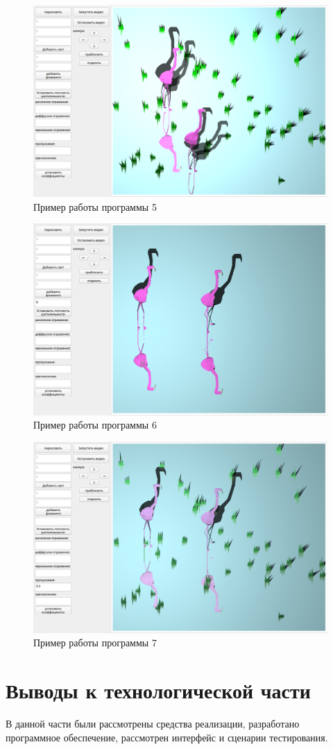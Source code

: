 \begin{figure}[h!]
	\centering
	\includegraphics[width=0.9\linewidth]{img/ex5}
	\caption{Пример работы программы 5}
	\label{fig:ex5}
\end{figure}

\begin{figure}[h!]
	\centering
	\includegraphics[width=0.9\linewidth]{img/ex7}
	\caption{Пример работы программы 6}
	\label{fig:ex6}
\end{figure}

\begin{figure}[h!]
	\centering
	\includegraphics[width=0.9\linewidth]{img/ex6}
	\caption{Пример работы программы 7}
	\label{fig:ex7}
\end{figure}
\clearpage


\section{Выводы к технологической части}

В данной части были рассмотрены средства реализации, разработано программное обеспечение, рассмотрен интерфейс и сценарии тестирования.